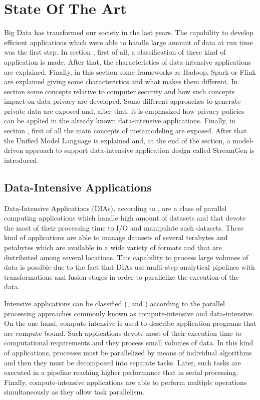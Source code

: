 \chapter[Chapter 2]{State Of The Art}
\label{sec:chapter2}

Big Data has transformed our society in the last years. The capability to develop efficient applications which were able to handle large amount of data at run time was the first step. In section , first of all, a classification of these kind of application is made. After that, the characteristics of data-intensive applications are explained. Finally, in this section some frameworks as Hadoop, Spark or Flink are explained giving some characteristics and what makes them different. In section  some concepts relative to computer security and how such concepts impact on data privacy are developed. Some different approaches to generate private data are exposed and, after that, it is emphasized how privacy policies can be applied in the already known data-intensive applications. Finally, in section , first of all the main concepts of metamodeling are exposed. After that the Unified Model Language is explained and, at the end of the section, a model-driven approach to support data-intensive application design called StreamGen is introduced.

\section{Data-Intensive Applications}

\label{Data-Intensive Applications}

Data-Intensive Applications (DIAs), according to \cite{cloudcomputing}, are a class of parallel computing applications which handle high amount of datasets and that devote the most of their processing time to I/O and manipulate such datasets. These kind of applications are able to manage datasets of several terabytes and petabytes which are available in a wide variety of formats and that are distributed among several locations. This capability to process large volumes of data is possible due to the fact that DIAs use multi-step analytical pipelines with transformations and fusion stages in order to parallelize the execution of the data.

Intensive applications can be classified (\cite{parallelcomputing}, \cite{computing21} and \cite{dataintensivecomputing}) according to the parallel processing approaches commonly known as compute-intensive and data-intensive. On the one hand, compute-intensive is used to describe application programs that are compute bound. Such applications devote most of their execution time to computational requirements and they process small volumes of data. In this kind of applications, processes must be parallelized by means of individual algorithms and then they must be decomposed into separate tasks. Later, such tasks are executed in a pipeline reaching higher performance that in serial processing. Finally, compute-intensive applications are able to perform multiple operations simultaneously as they allow task parallelism.

